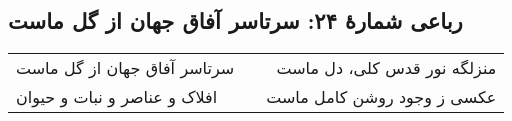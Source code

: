 \begin{center}
\section*{رباعی شمارهٔ ۲۴: سرتاسر آفاق جهان از گل ماست}
\label{sec:024}
\begin{longtable}{l p{0.5cm} r}
سرتاسر آفاق جهان از گل ماست
&&
منزلگه نور قدس کلی، دل ماست
\\
افلاک و عناصر و نبات و حیوان
&&
عکسی ز وجود روشن کامل ماست
\\
\end{longtable}
\end{center}
